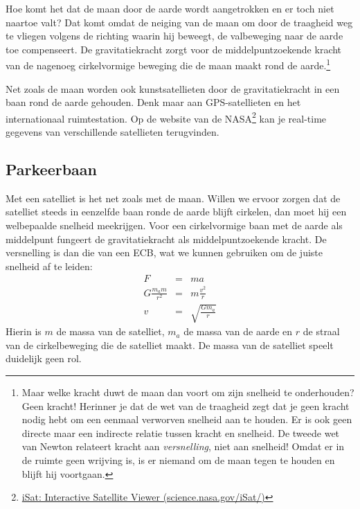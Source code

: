\documentclass{ximera}
\begin{document}
	\author{Bart Lambregs}
    \xmsource\xmuitleg



	Hoe komt het dat de maan door de aarde wordt aangetrokken en er toch niet naartoe valt? Dat komt omdat de neiging van de maan om door de traagheid weg te vliegen volgens de richting waarin hij beweegt, de valbeweging naar de aarde toe compenseert. De gravitatiekracht zorgt voor de middelpuntzoekende kracht van de nagenoeg cirkelvormige beweging die de maan maakt rond de aarde.\footnote{Maar welke kracht duwt de maan dan voort om zijn snelheid te onderhouden? Geen kracht! Herinner je dat de wet van de traagheid zegt dat je geen kracht nodig hebt om een eenmaal verworven snelheid aan te houden. Er is ook geen directe maar een indirecte relatie tussen kracht en snelheid. De tweede wet van Newton relateert kracht aan \textit{versnelling}, niet aan snelheid! Omdat er in de ruimte geen wrijving is, is er niemand om de maan tegen te houden en blijft hij voortgaan.}
	
	Net zoals de maan worden ook kunstsatellieten door de gravitatiekracht in een baan rond de aarde gehouden. Denk maar aan GPS-satellieten en het internationaal ruimtestation. Op de website van de NASA\footnote{\href{http://science.nasa.gov/iSat/}{iSat: Interactive Satellite Viewer (science.nasa.gov/iSat/)}} kan je real-time gegevens van verschillende satellieten terugvinden.
	
	\subsection{Parkeerbaan}
	
	Met een satelliet is het net zoals met de maan. Willen we ervoor zorgen dat de satelliet steeds in eenzelfde baan ronde de aarde blijft cirkelen, dan moet hij een welbepaalde snelheid meekrijgen. Voor een cirkelvormige baan met de aarde als middelpunt fungeert de gravitatiekracht als middelpuntzoekende kracht. De versnelling is dan die van een ECB, wat we kunnen gebruiken om de juiste snelheid af te leiden:
	\begin{eqnarray*}
	F&=&ma\\
	G\frac{m_am}{r^2}&=&m\frac{v^2}{r}\\
	v&=&\sqrt{\frac{Gm_a}{r}}
	\end{eqnarray*}
	Hierin is $m$ de massa van de satelliet, $m_a$ de massa van de aarde en $r$ de straal van de cirkelbeweging die de satelliet maakt. De massa van de satelliet speelt duidelijk geen rol. 
	
\end{document}
